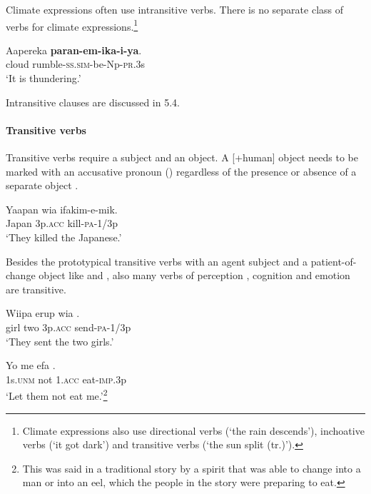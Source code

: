 Climate expressions often use intransitive verbs. There is no separate class of verbs for climate expressions.\footnote{Climate expressions also use directional verbs (`the rain descends'), inchoative verbs (`it got dark') and transitive verbs (`the sun split (tr.)').}

\ea%
\label{ex:3:x270}
\gll Aapereka \textbf{paran-em-ika-i-ya}. \\
cloud rumble-\textsc{ss}.\textsc{sim}-be-Np-\textsc{pr}.3s\\
\glt`It is thundering.'
\z

Intransitive clauses are discussed in 5.4.

\paragraph{Transitive verbs}\label{sec:3.8.4.2.2}
{}
Transitive verbs require a subject and an object. A [+human] object needs to be marked with an accusative pronoun () regardless of the presence or absence of a separate object . 

\ea%
\label{ex:3:x294}
\gll Yaapan wia ifakim-e-mik. \\
Japan 3p.\textsc{acc} kill-\textsc{pa}-1/3p \\
\glt`They killed the Japanese.'
\z

Besides the prototypical transitive verbs with an agent subject and a patient-of-change object \citep[96]{Givon1984} like  and , also many verbs of perception , cognition  and emotion  are transitive.

\ea%
\label{ex:3:x295}
\gll Wiipa erup wia . \\
girl two 3p.\textsc{acc} send-\textsc{pa}-1/3p \\
\glt`They sent the two girls.'
\z

\ea%
\label{ex:3:x296}
\gll Yo me efa . \\
1s.\textsc{unm} not 1.\textsc{acc} eat-\textsc{imp}.3p \\
\glt`Let them not eat me.'\footnote{This was said in a traditional story by a spirit that was able to change into a man or into an eel, which the people in the story were preparing to eat.}
\z

